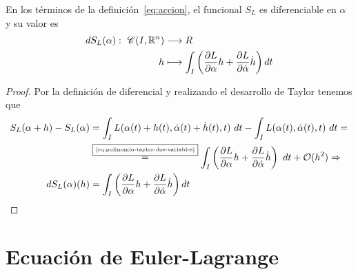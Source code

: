 \begin{theorem}
    En los términos de la definición~\eqref{eq:accion}, el funcional $S_L$ es diferenciable en $\alpha$ y su valor es
        \begin{align}
        \label{eq:accion_diferencial}
            dS_L(\alpha):\ \mathscr{C}(I, \mathbb{R}^n) & \longrightarrow R \\ h & \longmapsto \int_{I}\left( \frac{\partial L}{\partial\alpha}h+\frac{\partial L}{\partial\dot{\alpha}}\dot{h}\right) dt
        \end{align}
\end{theorem}
\begin{proof}
    Por la definición de diferencial y realizando el desarrollo de Taylor tenemos que
    \begin{equation*}
        \begin{split}
            S_L(\alpha + h) -  S_L(\alpha)& = \int_{I}L(\alpha(t)+h(t), \dot{\alpha}(t)+\dot{h}(t), t)\ dt - \int_{I}L(\alpha(t), \dot{\alpha}(t), t)\ dt =\\
            &\overset{\fbox{\tiny \ref{eq:polinomio-taylor-dos-variables}}}{=}\int_{I}\left( \frac{\partial L}{\partial\alpha}h+\frac{\partial L}{\partial\dot{\alpha}}\dot{h}\right)\ dt+\mathcal{O}(h^2)\Rightarrow\\
            dS_L(\alpha)(h) &=\int_{I}\left( \frac{\partial L}{\partial\alpha}h+\frac{\partial L}{\partial\dot{\alpha}}\dot{h}\right) dt
        \end{split}
    \end{equation*}
\end{proof}


\section{Ecuación de Euler-Lagrange}

